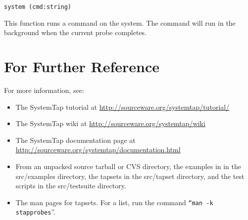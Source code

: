 \documentclass[twoside,english]{article}
\newenvironment{vindent}
{\begin{list}{}{\setlength{\listparindent}{6pt}}
\item[]}
{\end{list}}
\begin{document}
\begin{vindent}
\begin{verbatim}
system (cmd:string)
\end{verbatim}
\end{vindent}
This function runs a command on the system. The command will run in the background
when the current probe completes.


\section{For Further Reference\label{sec:For-Further-Reference}}

For more information, see:
\begin{itemize}
\item The SystemTap tutorial at \url{http://sourceware.org/systemtap/tutorial/}
\item The SystemTap wiki at \url{http://sourceware.org/systemtap/wiki}
\item The SystemTap documentation page at \url{http://sourceware.org/systemtap/documentation.html}
\item From an unpacked source tarball or CVS directory, the examples in in the
src/examples directory, the tapsets in the src/tapset directory, and the
test scripts in the src/testsuite directory.
\item The man pages for tapsets. For a list, run the command \texttt{{}``man -k
stapprobes}''.
\end {itemize}

\setcounter{secnumdepth}{0}
\newpage{}
\printindex{}
\end{document}

